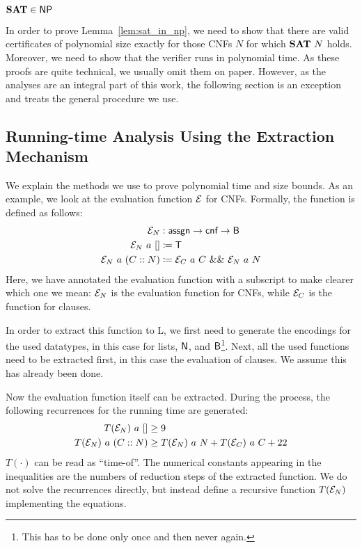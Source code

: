 \begin{lemma}[\SAT{} is in \NP{}]\label{lem:sat_in_np}
  $\textbf{SAT}{} \in \textsf{NP}{}$
\end{lemma}

In order to prove Lemma~\ref{lem:sat_in_np}, we need to show that there are valid certificates of polynomial size exactly for those CNFs $N$ for which $\textbf{SAT}{}~N$ holds. 
Moreover, we need to show that the verifier runs in polynomial time. 
As these proofs are quite technical, we usually omit them on paper. However, as the analyses are an integral part of this work, the following section is an exception and treats the general procedure we use.

\subsection{Running-time Analysis Using the Extraction Mechanism}
  We explain the methods we use to prove polynomial time and size bounds. 
  As an example, we look at the evaluation function $\mathcal{E}$ for CNFs. 
  Formally, the function is defined as follows:
  \begin{align*}
    \mathcal{E}_N &: \textsf{assgn} \rightarrow \textsf{cnf} \rightarrow \textsf{B} \\
    \mathcal{E}_N~a~[] &\coloneqq \mathsf{T} \\
    \mathcal{E}_N~a~(C::N) &\coloneqq \mathcal{E}_C~a~C~\&\&~\mathcal{E}_N~a~N
  \end{align*}
  Here, we have annotated the evaluation function with a subscript to make clearer which one we mean: $\mathcal{E}_N$ is the evaluation function for CNFs, while $\mathcal{E}_C$ is the function for clauses.

  In order to extract this function to L, we first need to generate the encodings for the used datatypes, in this case for lists, $\mathsf{N}$, and $\textsf{B}$\footnote{This has to be done only once and then never again.}. 
  Next, all the used functions need to be extracted first, in this case the evaluation of clauses. We assume this has already been done. 

  Now the evaluation function itself can be extracted. During the process, the following recurrences for the running time are generated:
  \begin{align}
    T(\mathcal{E}_N)~a~[] &\ge 9 \\
    T(\mathcal{E}_N)~a~(C :: N) &\ge T(\mathcal{E}_N)~a~N + T (\mathcal{E}_C)~a~C + 22
  \end{align}
  $T(\cdot)$ can be read as ``time-of''. The numerical constants appearing in the inequalities are the numbers of reduction steps of the extracted function.
  We do not solve the recurrences directly, but instead define a recursive function $T(\mathcal{E}_N)$ implementing the equations.

